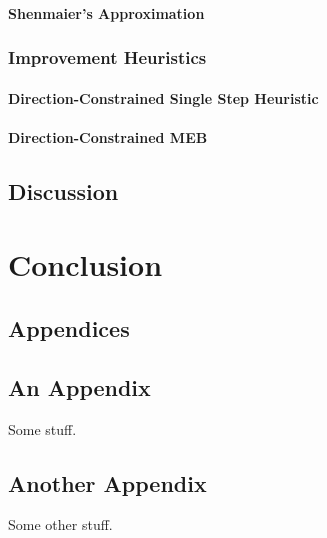 \documentclass[11pt,twoside]{report}
\theoremstyle{definition}
\numberwithin{theorem}{section}
\numberwithin{definition}{section}
\numberwithin{lemma}{section}
\numberwithin{proposition}{section}
\numberwithin{equation}{section}
\numberwithin{figure}{section}
\begin{document}
\subsubsection{Shenmaier's Approximation}

\subsection{Improvement Heuristics}
\subsubsection{Direction-Constrained Single Step Heuristic}
\subsubsection{Direction-Constrained MEB}

\section{Discussion}

\chapter{Conclusion}


\clearpage

\appendix
\section*{Appendices}

\section{An Appendix}
\label{app:one}

Some stuff.
\clearpage

\section{Another Appendix}
\label{app:two}

Some other stuff.
\end{document}
